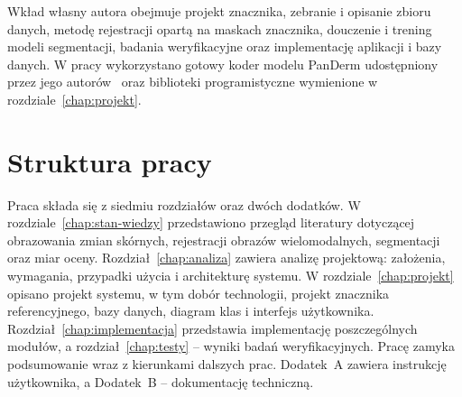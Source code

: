 Wkład własny autora obejmuje projekt znacznika, zebranie i opisanie zbioru danych, metodę rejestracji opartą na maskach znacznika, douczenie i trening modeli segmentacji, badania weryfikacyjne oraz implementację aplikacji i bazy danych. W pracy wykorzystano gotowy koder modelu PanDerm udostępniony przez jego autorów~\cite{yan2025panderm} oraz biblioteki programistyczne wymienione w rozdziale~\ref{chap:projekt}.

\section{Struktura pracy}
\label{sec:struktura}

Praca składa się z siedmiu rozdziałów oraz dwóch dodatków. W rozdziale~\ref{chap:stan-wiedzy} przedstawiono przegląd literatury dotyczącej obrazowania zmian skórnych, rejestracji obrazów wielomodalnych, segmentacji oraz miar oceny. Rozdział~\ref{chap:analiza} zawiera analizę projektową: założenia, wymagania, przypadki użycia i architekturę systemu. W rozdziale~\ref{chap:projekt} opisano projekt systemu, w tym dobór technologii, projekt znacznika referencyjnego, bazy danych, diagram klas i interfejs użytkownika. Rozdział~\ref{chap:implementacja} przedstawia implementację poszczególnych modułów, a rozdział~\ref{chap:testy} -- wyniki badań weryfikacyjnych. Pracę zamyka podsumowanie wraz z kierunkami dalszych prac. Dodatek~A zawiera instrukcję użytkownika, a Dodatek~B -- dokumentację techniczną.
